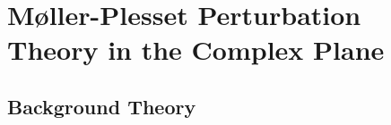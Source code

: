 \documentclass[aps,prb,reprint,noshowkeys,linenumbers,superscriptaddress]{revtex4-1}
\newcommand{\titou}[1]{\textcolor{red}{#1}}
\begin{document}

\section{M{\o}ller-Plesset Perturbation Theory in the Complex Plane}
\label{sec:MP}


\subsection{Background Theory}
\end{document}

